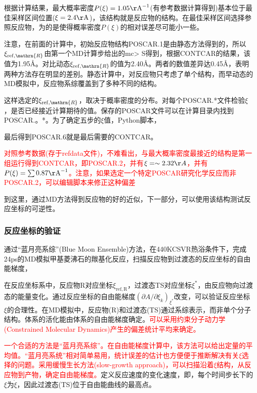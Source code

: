 根据计算结果，最大概率密度$P(\xi)=1.05\mathrm{\AA}^{-1}$(有参考数据计算得到)基本位于最佳采样区间位置($\xi=2.4\mathrm{\AA}$)，该结构就是反应物的结构。在最佳采样区间选择参照反应物，为的是使得概率密度$P(\xi)$的相对误差尽可能小一些。

注意，在前面的计算中，初始反应物结构\textrm{POSCAR.1}是由静态方法得到的，所以$\xi_{\mathrm{ref},\mathrn{R}}$由第一个\textrm{MD}计算步给出的\textrm{mc> S}得到，根据\textrm{CONTCAR}的结果，该值为\textrm{1.95\AA}。对比动态$\xi_{\mathrm{ref},\mathrn{R}}$的值为\textrm{2.40\AA}。两者的数值差异达\textrm{0.45\AA}，表明两种方法存在明显的差别。静态计算中，对反应物只考虑了单个结构，而早动态的\textrm{MD}模拟中，反应物系综覆盖到了多种不同的结构。

这样选定的$\xi_{\mathrm{ref},\mathrn{R}}$，取决于概率密度的分布。对每个\textrm{POSCAR.*}文件检验$\xi$，是否已经接近计算期待的值。保存的\textrm{POSCAR}文件可以在计算目录内找到\textrm{POSCAR.。*}。为了确定五步的$\xi$值，\textrm{Python}脚本，

最后得到\textrm{POSCAR.6}就是最后需要的\textrm{CONTCAR}。

\textcolor{red}{对照参考数据(存于\textrm{refdata}文件)，不难看出，与最大概率密度最接近的结构是第一组运行得到\textrm{CONTCAR}，即\textrm{POSCAR.2}，并有$\xi=\sim2.32\AA$，并有$P(\xi)=\sum0.87\mathrm{\AA}^{-1}$。注意，如果选定一个特定\textrm{POSCAR}研究化学反应而非\textrm{POSCAR.2}，可以编辑脚本来修正这种偏差}

到这里，通过\textrm{MD}方法得到反应物的好的近似，下一部分，可以使用该结构测试反应坐标的可逆性。

\subsubsection{反应坐标的验证}
通过``蓝月亮系综''\textrm{(Blue Moon Ensemble)}方法，在\textrm{440K}\textrm{CSVR}热浴条件下，完成\textrm{24ps}的\textrm{MD}模拟甲基菱沸石的羰基化反应，扫描反应物到过渡态的反应坐标的自由能梯度，

在反应坐标系中，反应物\textrm{R}对应坐标$\xi_{\mathrm{ref},\mathrm{R}}$，过渡态\textrm{TS}对应坐标$\xi^{\ast}$，由反应物向过渡态的能量变化。通过反应坐标的自由能梯度$(\partial A/\partial\xi_k)_{\xi^{\ast}}$改变，可以验证反应坐标$\xi$的合理性。在\textrm{MD}模拟中，反应物\textrm{(R)}和过渡态\textrm{(TS)}通过系综表示，而非单个分子结构。体系的活化能由体系的自由能梯度确定。\textcolor{red}{可以采用约束分子动力学\textrm{(Constrained Molecular Dynamics)}产生的偏差统计平均来确定。}

\textcolor{red}{一个合适的方法是``蓝月亮系综''。在自由能梯度计算中，该方法可以给出定量的平均值。``蓝月亮系统''相对简单易用，统计误差的估计也方便便于推断解决有关$\xi$选择的问题。采用缓慢生长方法\textrm{(slow-growth approach)}，可以扫描沿着$\xi$结构，从反应物到产物，确定自由能梯度。}定义反应速度的变化速度，即，每个时间步长下的$\xi$为$\dot{\xi}$，因此过渡态\textrm{(TS)}位于自由能曲线的最高点。

